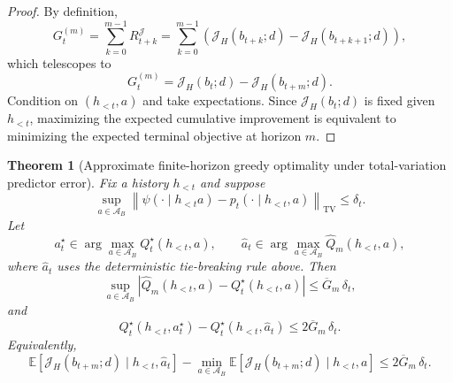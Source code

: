 \documentclass[11pt]{article}
\newtheorem{theorem}{Theorem}
\begin{document}
\begin{proof}
By definition,
\[
G_t^{(m)}
=
\sum_{k=0}^{m-1}R_{t+k}^{\mathcal{J}}
=
\sum_{k=0}^{m-1}
\left(
\mathcal{J}_H(b_{t+k};d)-\mathcal{J}_H(b_{t+k+1};d)
\right),
\]
which telescopes to
\[
G_t^{(m)}
=
\mathcal{J}_H(b_t;d)-\mathcal{J}_H(b_{t+m};d).
\]
Condition on $(h_{<t},a)$ and take expectations. Since
$\mathcal{J}_H(b_t;d)$ is fixed given $h_{<t}$, maximizing the expected
cumulative improvement is equivalent to minimizing the expected terminal
objective at horizon $m$.
\end{proof}

\begin{theorem}[Approximate finite-horizon greedy optimality under total-variation predictor error]
\label{thm:aiqi-warmstart-tv-robust}
Fix a history $h_{<t}$ and suppose
\[
\sup_{a\in\mathcal{A}_B}
\left\|
\psi(\cdot\mid h_{<t}a)-p_t(\cdot\mid h_{<t},a)
\right\|_{\mathrm{TV}}
\le \delta_t.
\]
Let
\[
a_t^\star\in\arg\max_{a\in\mathcal{A}_B}Q_t^\star(h_{<t},a),
\qquad
\hat a_t\in\arg\max_{a\in\mathcal{A}_B}\widehat Q_m(h_{<t},a),
\]
where $\hat a_t$ uses the deterministic tie-breaking rule above. Then
\[
\sup_{a\in\mathcal{A}_B}
\left|
\widehat Q_m(h_{<t},a)-Q_t^\star(h_{<t},a)
\right|
\le
\overline G_m\,\delta_t,
\]
and
\[
Q_t^\star(h_{<t},a_t^\star)-Q_t^\star(h_{<t},\hat a_t)
\le
2\overline G_m\,\delta_t.
\]
Equivalently,
\[
\mathbb{E}\!\left[\mathcal{J}_H(b_{t+m};d)\mid h_{<t},\hat a_t\right]
-
\min_{a\in\mathcal{A}_B}
\mathbb{E}\!\left[\mathcal{J}_H(b_{t+m};d)\mid h_{<t},a\right]
\le
2\overline G_m\,\delta_t.
\]
\end{theorem}
\end{document}
